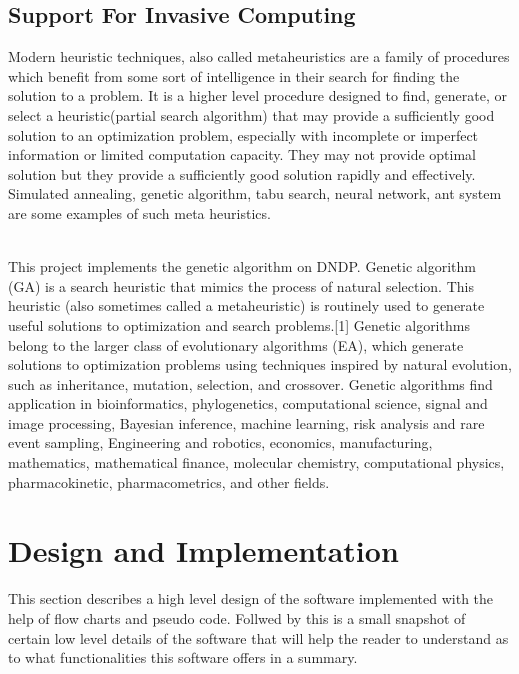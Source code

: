 \documentclass[a4paper, 12pt]{article}
\begin{document}
\subsection{Support For Invasive Computing}
Modern heuristic techniques, also called metaheuristics are a family of procedures which benefit from some sort of intelligence in their search for finding the solution to a problem. It is a higher level procedure designed to find, generate, or select a heuristic(partial search algorithm) that may provide a sufficiently good solution to an optimization problem, especially with incomplete or imperfect information or limited computation capacity. They may not provide optimal solution but they provide a sufficiently good solution rapidly and effectively. Simulated annealing, genetic algorithm, tabu search, neural network, ant system are some examples of such meta heuristics.\par
\noindent
\\This project implements the genetic algorithm on DNDP. Genetic algorithm (GA) is a search heuristic that mimics the process of natural selection. This heuristic (also sometimes called a metaheuristic) is routinely used to generate useful solutions to optimization and search problems.[1] Genetic algorithms belong to the larger class of evolutionary algorithms (EA), which generate solutions to optimization problems using techniques inspired by natural evolution, such as inheritance, mutation, selection, and crossover. Genetic algorithms find application in bioinformatics, phylogenetics, computational science, signal and image processing, Bayesian inference, machine learning, risk analysis and rare event sampling, Engineering and robotics, economics, manufacturing, mathematics, mathematical finance, molecular chemistry, computational physics, pharmacokinetic, pharmacometrics, and other fields.\par
\clearpage
\section{Design and Implementation}
This section describes a high level design of the software implemented with the help of flow charts and pseudo code. Follwed by this is a small snapshot of certain low level details of the software that will help the reader to understand as to what functionalities this software offers in a summary.
\end{document}

